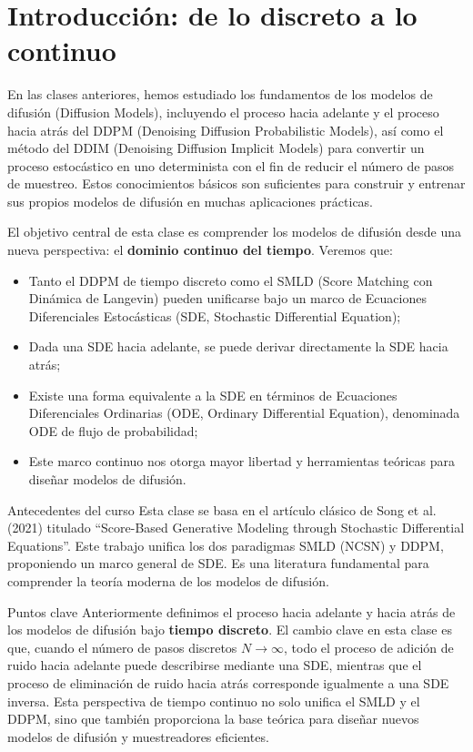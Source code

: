 \section{Introducción: de lo discreto a lo continuo}

En las clases anteriores, hemos estudiado los fundamentos de los modelos de difusión (Diffusion Models), incluyendo el proceso hacia adelante y el proceso hacia atrás del DDPM (Denoising Diffusion Probabilistic Models), así como el método del DDIM (Denoising Diffusion Implicit Models) para convertir un proceso estocástico en uno determinista con el fin de reducir el número de pasos de muestreo. Estos conocimientos básicos son suficientes para construir y entrenar sus propios modelos de difusión en muchas aplicaciones prácticas.

El objetivo central de esta clase es comprender los modelos de difusión desde una nueva perspectiva: el \textbf{dominio continuo del tiempo}. Veremos que:

\begin{itemize}
    \item Tanto el DDPM de tiempo discreto como el SMLD (Score Matching con Dinámica de Langevin) pueden unificarse bajo un marco de Ecuaciones Diferenciales Estocásticas (SDE, Stochastic Differential Equation);
    \item Dada una SDE hacia adelante, se puede derivar directamente la SDE hacia atrás;
    \item Existe una forma equivalente a la SDE en términos de Ecuaciones Diferenciales Ordinarias (ODE, Ordinary Differential Equation), denominada ODE de flujo de probabilidad;
    \item Este marco continuo nos otorga mayor libertad y herramientas teóricas para diseñar modelos de difusión.
\end{itemize}

\begin{knowledgebox}{Antecedentes del curso}
Esta clase se basa en el artículo clásico de Song et al. (2021) titulado ``Score-Based Generative Modeling through Stochastic Differential Equations''. Este trabajo unifica los dos paradigmas SMLD (NCSN) y DDPM, proponiendo un marco general de SDE. Es una literatura fundamental para comprender la teoría moderna de los modelos de difusión.
\end{knowledgebox}

\begin{importantbox}{Puntos clave}
Anteriormente definimos el proceso hacia adelante y hacia atrás de los modelos de difusión bajo \textbf{tiempo discreto}. El cambio clave en esta clase es que, cuando el número de pasos discretos $N \to \infty$, todo el proceso de adición de ruido hacia adelante puede describirse mediante una SDE, mientras que el proceso de eliminación de ruido hacia atrás corresponde igualmente a una SDE inversa. Esta perspectiva de tiempo continuo no solo unifica el SMLD y el DDPM, sino que también proporciona la base teórica para diseñar nuevos modelos de difusión y muestreadores eficientes.
\end{importantbox}
